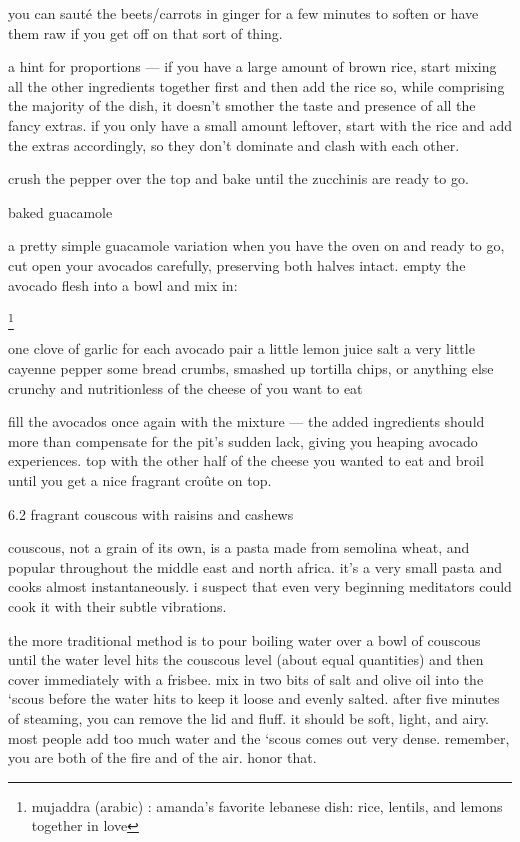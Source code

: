 you can saut\'{e} the beets/carrots in ginger for a few minutes to soften or have them raw if you get off on that sort of thing. 

a hint for proportions --- if you have a large amount of brown rice, start mixing all the other ingredients together first and then add the rice so, while comprising the majority of the dish, it doesn't smother the taste and presence of all the fancy extras. if you only have a small amount leftover, start with the rice and add the extras accordingly, so they don't dominate and clash with each other.

crush the pepper over the top and bake until the zucchinis are ready to go.

baked guacamole

a pretty simple guacamole variation when you have the oven on and ready to go, cut open your avocados carefully, preserving both halves intact.
empty the avocado flesh into a bowl and mix in:

\footnote{mujaddra (arabic) : amanda's favorite lebanese dish: rice, lentils, and lemons together in love}

	one clove of garlic for each avocado pair
	a little lemon juice
	salt
	a very little cayenne pepper
	some bread crumbs, smashed up tortilla chips, or anything else crunchy and nutritionless
	\onehalf of the cheese of you want to eat

fill the avocados once again with the mixture --- the added ingredients should more than compensate for the pit's sudden lack, giving you heaping avocado experiences. top with the other half of the cheese you wanted to eat and broil until you get a nice fragrant cro\^{u}te on top.
	
6.2  fragrant couscous with raisins and cashews

couscous, not a grain of its own, is a pasta made from semolina wheat, and popular throughout the middle east and north africa. it's a very small pasta and cooks almost instantaneously. i suspect that even very beginning meditators could cook it with their subtle vibrations.

the more traditional method is to pour boiling water over a bowl of couscous until the water level hits the couscous level (about equal quantities) and then cover immediately with a frisbee. mix in two bits of salt and olive oil into the `scous before the water hits to keep it loose and evenly salted. after five minutes of steaming, you can remove the lid and fluff. it should be soft, light, and airy. most people add too much water and the `scous comes out very dense. remember, you are both of the fire and of the air. honor that.

